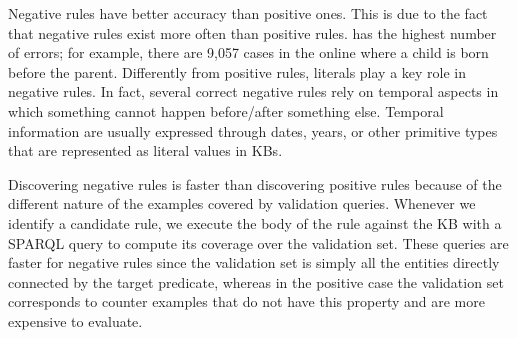 Negative rules have better accuracy than positive ones. 
This is due to the fact that negative rules exist more often than positive rules.
 \yago has the highest number of errors; for example, there are 9,057 cases in the online \yago where a child is born before the parent. 
%
Differently from positive rules, literals play a key role in negative rules. In fact, several correct negative rules rely on temporal aspects in which something cannot happen before/after something else. Temporal information are usually expressed through dates, years, or other primitive types that are represented as literal values in KBs.

Discovering negative rules is faster than discovering positive rules
because of the different nature of the examples covered by validation queries. 
Whenever we identify a candidate rule, we execute the body of the rule against the KB with a SPARQL query to compute its coverage over the validation set. 
These queries are faster for negative rules since the validation set is simply all the entities directly connected by the target predicate, whereas in the positive case the validation set corresponds to counter examples that do not have this property and are more expensive to evaluate.

